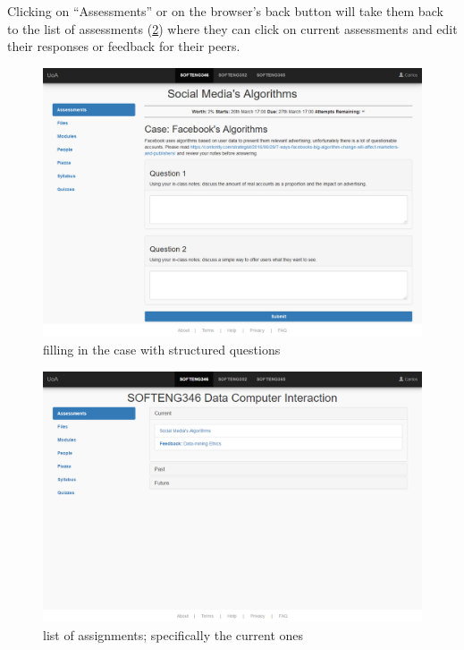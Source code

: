 \documentclass[10pt,a4paper]{article}
\begin{document}
	Clicking on ``Assessments'' or on the browser's back button will take them back to the list of assessments (\cref{fig:two}) where they can click on current assessments and edit their responses or feedback for their peers.
	
	\begin{figure}[H]
		\centering
		\includegraphics[width=\textwidth]{1 - Social Medias Algorithms.PNG}
		\caption{filling in the case with structured questions}
		\label{fig:one}
	\end{figure}
	\begin{figure}[H]
		\centering
		\includegraphics[width=\textwidth]{2 - Assessments (Current).PNG}
		\caption{list of assignments; specifically the current ones}
		\label{fig:two}
	\end{figure}
\end{document}
